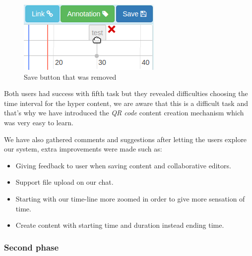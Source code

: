 \begin{figure}[!htb]
\centering
\begin{minipage}[b]{0.3\linewidth}
\centering

    \includegraphics[width=\textwidth]{figures/test_ui_05.png}
\end{minipage}


    \caption{Save button that was removed}
    \label{fig:test_ui_05}
\end{figure}

Both users had success with fifth task but they revealed difficulties choosing the time interval for the hyper content, we are aware that this is a difficult task and that's why we have introduced the \emph{QR code} content creation mechanism which was very easy to learn.

We have also gathered comments and suggestions after letting the users explore our system, extra improvements were made such as:

\begin{itemize}
\item Giving feedback to user when saving content and collaborative editors.
\item Support file upload on our chat.
\item Starting with our time-line more zoomed in order to give more sensation of time.
\item Create content with starting time and duration instead ending time.
\end{itemize}

  \subsubsection {Second phase}